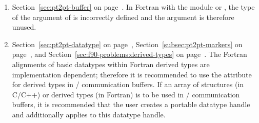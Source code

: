 \begin{enumerate}
\item 
Section~\ref{sec:pt2pt-buffer} on page~\pageref{sec:pt2pt-buffer}.
\newline 
In Fortran with the  module or , 
the type of the  argument of 
is incorrectly defined and the argument is therefore unused.
 
\item 
Section~\ref{sec:pt2pt-datatype} on page~\pageref{sec:pt2pt-datatype},
Section~\ref{subsec:pt2pt-markers} on page~\pageref{subsec:pt2pt-markers}, and
Section~\ref{sec:f90-problems:derived-types} on page~\pageref{sec:f90-problems:derived-types}.
\newline 
The Fortran alignments of basic datatypes within Fortran derived types
are implementation dependent; 
therefore it is recommended to use the  attribute for derived types
in \MPI/ communication buffers. 
If an array of structures (in C/C++) or derived types (in Fortran) 
is to be used in \MPI/ communication buffers, 
it is recommended that the user creates a portable datatype handle and 
additionally applies  to this datatype handle.


\end{enumerate}

